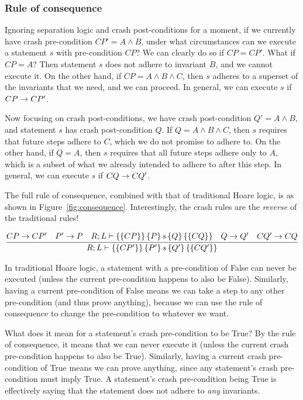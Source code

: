 \subsubsection{Rule of consequence}


Ignoring separation logic and crash post-conditions for a moment, if we
currently have crash pre-condition $CP'=A \wedge B$, under what circumstances
can we execute a statement $s$ with pre-condition $CP$? We can clearly do so if
$CP=CP'$. What if $CP=A$? Then statement $s$ does not adhere to invariant $B$,
and we cannot execute it. On the other hand, if $CP=A \wedge B \wedge C$, then
$s$ adheres to a superset of the invariants that we need, and we can proceed. In
general, we can execute $s$ if $CP \rightarrow CP'$.

Now focusing on crash post-conditions, we have crash post-condition $Q'=A \wedge
B$, and statement $s$ has crash post-condition $Q$. If $Q=A \wedge B \wedge C$,
then $s$ requires that future steps adhere to $C$, which we do not promise to
adhere to. On the other hand, if $Q=A$, then $s$ requires that all future steps
adhere only to $A$, which is a subset of what we already intended to adhere to
after this step. In general, we can execute $s$ if $CQ \rightarrow CQ'$.

The full rule of consequence, combined with that of traditional Hoare logic, is
as shown in Figure~\ref{fig:consequence}. Interestingly, the crash rules are the
\textit{reverse} of the traditional rules!

\begin{figure*}
\begin{gather*}
\infer{\hoarestmt{R}{L}{CP'}{P'}{s}{Q'}{CQ'}}
      {CP \imp CP' & P' \imp P & \hoarestmt{R}{L}{CP}{P}{s}{Q}{CQ}
      & Q \imp Q' & CQ' \imp CQ}
\end{gather*}
\caption{Rule of Consequence}
\label{fig:consequence}
\end{figure*}

In traditional Hoare logic, a statement with a pre-condition of False can never
be executed (unless the current pre-condition happens to also be False).
Similarly, having a current pre-condition of False means we can take a step to
any other pre-condition (and thus prove anything), because we can use the rule
of consequence to change the pre-condition to whatever we want.

What does it mean for a statement's crash pre-condition to be True? By the rule
of consequence, it means that we can never execute it (unless the current crash
pre-condition happens to also be True). Similarly, having a current crash
pre-condition of True means we can prove anything, since any statement's crash
pre-condition must imply True. A statement's crash pre-condition being True is
effectively saying that the statement does not adhere to \textit{any}
invariants.

